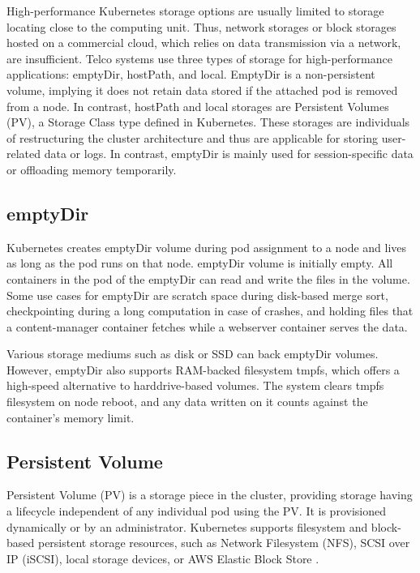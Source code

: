 High-performance Kubernetes storage options are usually limited to storage locating close to the computing unit. Thus, network storages or block storages hosted on a commercial cloud, which relies on data transmission via a network, are insufficient. Telco systems use three types of storage for high-performance applications: emptyDir, hostPath, and local. EmptyDir is a non-persistent volume, implying it does not retain data stored if the attached pod is removed from a node. In contrast, hostPath and local storages are Persistent Volumes (PV), a Storage Class type defined in Kubernetes. These storages are individuals of restructuring the cluster architecture and thus are applicable for storing user-related data or logs. In contrast, emptyDir is mainly used for session-specific data or offloading memory temporarily.

\subsection{emptyDir}

Kubernetes creates emptyDir volume during pod assignment to a node and lives as long as the pod runs on that node. emptyDir volume is initially empty. All containers in the pod of the emptyDir can read and write the files in the volume. Some use cases for emptyDir are scratch space during disk-based merge sort, checkpointing during a long computation in case of crashes, and holding files that a content-manager container fetches while a webserver container serves the data. \cite{VolumesKubernetes}

Various storage mediums such as disk or SSD can back emptyDir volumes. However, emptyDir also supports RAM-backed filesystem tmpfs, which offers a high-speed alternative to harddrive-based volumes. The system clears tmpfs filesystem on node reboot, and any data written on it counts against the container's memory limit. \cite{VolumesKubernetes}

\subsection{Persistent Volume}

Persistent Volume (PV) is a storage piece in the cluster, providing storage having a lifecycle independent of any individual pod using the PV. It is provisioned dynamically or by an administrator. Kubernetes supports filesystem and block-based persistent storage resources, such as Network Filesystem (NFS), SCSI over IP (iSCSI), local storage devices, or AWS Elastic Block Store \cite{AmazonEBS}.\cite{PV}

